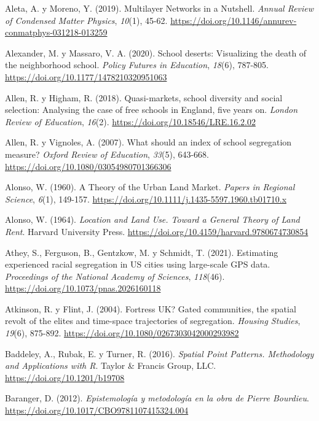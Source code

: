 \documentclass[
  spanish,
  a4paper,%
  chapterprefix=true,%
  DIV=calc,%
  twoside]{scrbook}%
\newlength{\cslhangindent}
\newenvironment{CSLReferences}[2] %
 {\begin{list}{}{%
  \setlength{\itemindent}{0pt}
  \setlength{\leftmargin}{0pt}
  \setlength{\parsep}{0pt}
  \ifodd #1
   \setlength{\leftmargin}{\cslhangindent}
   \setlength{\itemindent}{-1\cslhangindent}
  \fi
  \setlength{\itemsep}{#2\baselineskip}}}
 {\end{list}}
\begin{document}
\begin{CSLReferences}{1}{0}
Aleta, A. y Moreno, Y. (2019). Multilayer Networks in a Nutshell. \emph{Annual Review of Condensed Matter Physics}, \emph{10}(1), 45-62. \url{https://doi.org/10.1146/annurev-conmatphys-031218-013259}

Alexander, M. y Massaro, V. A. (2020). School deserts: Visualizing the death of the neighborhood school. \emph{Policy Futures in Education}, \emph{18}(6), 787-805. \url{https://doi.org/10.1177/1478210320951063}

Allen, R. y Higham, R. (2018). Quasi-markets, school diversity and social selection: Analysing the case of free schools in England, five years on. \emph{London Review of Education}, \emph{16}(2). \url{https://doi.org/10.18546/LRE.16.2.02}

Allen, R. y Vignoles, A. (2007). What should an index of school segregation measure? \emph{Oxford Review of Education}, \emph{33}(5), 643-668. \url{https://doi.org/10.1080/03054980701366306}

Alonso, W. (1960). A Theory of the Urban Land Market. \emph{Papers in Regional Science}, \emph{6}(1), 149-157. \url{https://doi.org/10.1111/j.1435-5597.1960.tb01710.x}

Alonso, W. (1964). \emph{Location and Land Use. Toward a General Theory of Land Rent}. Harvard University Press. \url{https://doi.org/10.4159/harvard.9780674730854}

Athey, S., Ferguson, B., Gentzkow, M. y Schmidt, T. (2021). Estimating experienced racial segregation in US cities using large-scale GPS data. \emph{Proceedings of the National Academy of Sciences}, \emph{118}(46). \url{https://doi.org/10.1073/pnas.2026160118}

Atkinson, R. y Flint, J. (2004). Fortress UK? Gated communities, the spatial revolt of the elites and time-space trajectories of segregation. \emph{Housing Studies}, \emph{19}(6), 875-892. \url{https://doi.org/10.1080/0267303042000293982}

Baddeley, A., Rubak, E. y Turner, R. (2016). \emph{Spatial Point Patterns. Methodology and Applications with R}. Taylor \& Francis Group, LLC. \url{https://doi.org/10.1201/b19708}

Baranger, D. (2012). \emph{Epistemología y metodología en la obra de Pierre Bourdieu}. \url{https://doi.org/10.1017/CBO9781107415324.004}


\end{CSLReferences}
\end{document}
